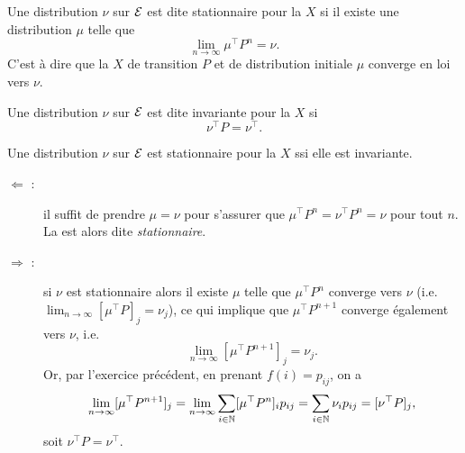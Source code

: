 \begin{definition}
  Une distribution $\nu$ sur $\mathcal{E}$ est dite stationnaire pour la \cM $X$ si il existe une distribution $\mu$ telle que 
  $$
  \lim_{n \to \infty} \mu^\top P^n = \nu.
  $$
  C'est à dire que la \cM $X$ de transition $P$ et de distribution initiale $\mu$ converge en loi vers $\nu$.
\end{definition}

\begin{definition}
  Une distribution $\nu$ sur $\mathcal{E}$ est dite invariante pour la \cM $X$ si 
  $$
  \nu^\top P = \nu^\top.
  $$
\end{definition}

\begin{proposition} \label{prop:stationnaireInvariante}
  Une distribution $\nu$ sur $\mathcal{E}$ est stationnaire pour la \cM $X$ ssi elle est invariante.
\end{proposition}

\proof
\begin{description}
  \item[$\Leftarrow$ :] il suffit de prendre $\mu = \nu$ pour s'assurer que $\mu^\top P^n = \nu^\top P^n = \nu$ pour tout $n$. La \cM est alors dite {\em stationnaire}.
  \item[$\Rightarrow$ :] si $\nu$ est stationnaire alors il existe $\mu$ telle que $\mu^\top P^n$ converge vers $\nu$ (i.e. $\lim_{n \to \infty} [\mu^\top P]_j = \nu_j$), ce qui implique que $\mu^\top P^{n+1}$ converge également vers $\nu$, i.e.
  $$
  \lim_{n \to \infty} [\mu^\top P^{n+1}]_j = \nu_j.
  $$
  Or, par l'exercice précédent, en prenant $f(i) = p_{ij}$, on a
  $$
  \lim_{n \to \infty} [\mu^\top P^{n+1}]_j
  = \lim_{n \to \infty} \sum_{i \in \mathbb{N}} [\mu^\top P^n]_i p_{ij}
  = \sum_{i \in \mathbb{N}} \nu_i p_{ij}
  = [\nu^\top P]_j,
  $$
  soit $\nu^\top P = \nu^\top$.
\end{description}
\eproof


